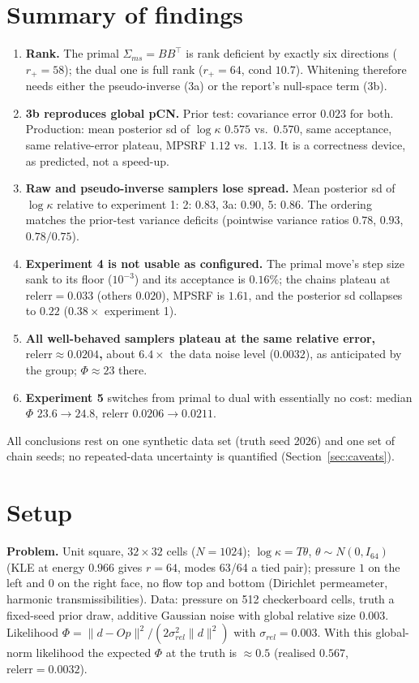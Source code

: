 \documentclass[11pt]{article}
\newcommand{\rel}{\mathrm{relerr}}
\begin{document}
\section{Summary of findings}
\begin{enumerate}
\item \textbf{Rank.} The primal $\Sigma_{ms}=BB^\top$ is rank deficient by exactly six directions ($r_+=58$); the dual one is full rank ($r_+=64$, cond $10.7$). Whitening therefore needs either the pseudo-inverse (3a) or the report's null-space term (3b).
\item \textbf{3b reproduces global pCN.} Prior test: covariance error $0.023$ for both. Production: mean posterior sd of $\log\kappa$ $0.575$ vs.\ $0.570$, same acceptance, same relative-error plateau, MPSRF $1.12$ vs.\ $1.13$. It is a correctness device, as predicted, not a speed-up.
\item \textbf{Raw and pseudo-inverse samplers lose spread.} Mean posterior sd of $\log\kappa$ relative to experiment 1: 2: $0.83$, 3a: $0.90$, 5: $0.86$. The ordering matches the prior-test variance deficits (pointwise variance ratios $0.78$, $0.93$, $0.78/0.75$).
\item \textbf{Experiment 4 is not usable as configured.} The primal move's step size sank to its floor ($10^{-3}$) and its acceptance is $0.16\%$; the chains plateau at $\rel=0.033$ (others $0.020$), MPSRF is $1.61$, and the posterior sd collapses to $0.22$ ($0.38\times$ experiment 1).
\item \textbf{All well-behaved samplers plateau at the same relative error, $\rel\approx0.0204$,} about $6.4\times$ the data noise level ($0.0032$), as anticipated by the group; $\Phi\approx 23$ there.
\item \textbf{Experiment 5} switches from primal to dual with essentially no cost: median $\Phi$ $23.6\to24.8$, $\rel$ $0.0206\to0.0211$.
\end{enumerate}
All conclusions rest on one synthetic data set (truth seed 2026) and one set of chain seeds; no repeated-data uncertainty is quantified (Section~\ref{sec:caveats}).

\section{Setup}
\textbf{Problem.} Unit square, $32\times32$ cells ($N=1024$); $\log\kappa=T\theta$, $\theta\sim N(0,I_{64})$ (KLE at energy $0.966$ gives $r=64$, modes 63/64 a tied pair); pressure $1$ on the left and $0$ on the right face, no flow top and bottom (Dirichlet permeameter, harmonic transmissibilities). Data: pressure on 512 checkerboard cells, truth a fixed-seed prior draw, additive Gaussian noise with global relative size $0.003$. Likelihood $\Phi=\|d-Op\|^2/(2\sigma_{rel}^2\|d\|^2)$ with $\sigma_{rel}=0.003$. With this global-norm likelihood the expected $\Phi$ at the truth is $\approx0.5$ (realised $0.567$, $\rel=0.0032$).
\end{document}
